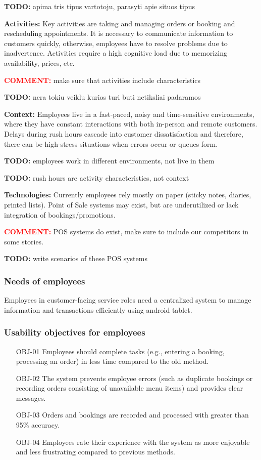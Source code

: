 \documentclass[]{VUMIFTemplateClass}
\newcommand{\yellowcomment}[1]{%
    \begin{tcolorbox}[colback=yellow!80, colframe=yellow!80, arc=0pt, outer arc=0pt, boxrule=0pt, left=3pt, right=3pt, top=3pt, bottom=3pt]
        \textbf{\textcolor{red}{COMMENT:}} #1
    \end{tcolorbox}
}
\newcommand{\todocomment}[1]{%
    \begin{tcolorbox}[colback=red!20, colframe=red!60, arc=0pt, outer arc=0pt, boxrule=1pt, left=3pt, right=3pt, top=3pt, bottom=3pt]
        \textbf{\textcolor{orange!70!black}{TODO:}} #1
    \end{tcolorbox}
}
\begin{document}
    \todocomment{apima tris tipus vartotoju, parasyti apie situos tipus}

    \textbf{Activities:} Key activities are taking and managing orders or
    booking and rescheduling appointments. It is necessary to communicate
    information to customers quickly, otherwise, employees have
    to resolve problems due to inadvertence. Activities require a
    high cognitive load due to memorizing availability, prices, etc. 

    \yellowcomment{make sure that activities include characteristics}
    \todocomment{nera tokiu veiklu kurios turi buti netiksliai padaramos}
    
    \textbf{Context:} Employees live in a fast-paced, noisy and time-sensitive
    environments, where they have constant interactions with both in-person and
    remote customers. Delays during rush hours cascade into customer
    dissatisfaction and therefore, there can be high-stress situations when
    errors occur or queues form.

    \todocomment{employees work in different environments, not live in them}
    \todocomment{rush hours are activity characteristics, not context}
    
    \textbf{Technologies:} Currently employees rely mostly on paper (sticky
    notes, diaries, printed lists). Point of Sale systems may exist, but are
    underutilized or lack integration of bookings/promotions.  
    \yellowcomment{POS systems do exist, make sure to include our competitors in some stories.}
    \todocomment{write scenarios of these POS systems}
\subsubsection{Needs of employees}
Employees in customer-facing service roles need a centralized system to manage information and transactions efficiently using android tablet. 
\subsubsection{Usability objectives for employees}
\begin{itemize}
    \item[OBJ-01] Employees should complete tasks (e.g., entering a booking, processing an order) in less time compared to the old method.
    \item[OBJ-02] The system prevents employee errors (such as duplicate bookings or recording orders consisting of unavailable menu items) and provides clear messages.
    \item[OBJ-03] Orders and bookings are recorded and processed with greater than 95\% accuracy.
    \item[OBJ-04] Employees rate their experience with the system as more enjoyable and less frustrating compared to previous methods.
\end{itemize}
\end{document}
